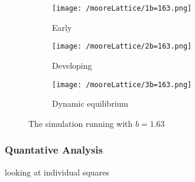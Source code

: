\begin{figure}
	\centering
	\begin{subfigure}{.3\textwidth}
		\centering
		\texttt{[image: /mooreLattice/1b=163.png]}
		\caption{Early}
		\label{fig:dir}
	\end{subfigure}%
	\begin{subfigure}{.3\textwidth}
		\centering
		\texttt{[image: /mooreLattice/2b=163.png]}
		\caption{Developing}
		\label{fig:loop}
	\end{subfigure}
	\begin{subfigure}{.3\textwidth}
		\centering
		\texttt{[image: /mooreLattice/3b=163.png]}
		\caption{Dynamic equilibrium}
		\label{fig:undirected}
	\end{subfigure}
	\caption{The simulation running with $b=1.63$}
	\label{fig:complete graphs}
\end{figure}
\subsubsection{Quantative Analysis}
looking at individual squares


